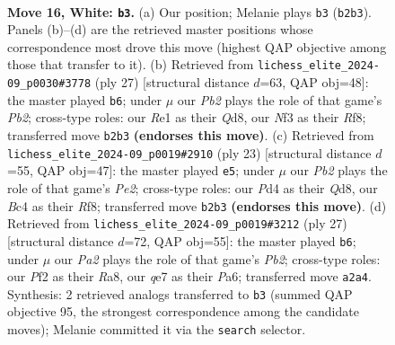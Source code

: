 \documentclass[11pt]{article}
\begin{document}
\clearpage

\begin{figure}[p]\centering
\begin{subfigure}{0.46\textwidth}\centering
\resizebox{\linewidth}{!}{%
\newchessgame
\chessboard[
  setfen={rr4k1/p1pbqppp/4pn2/p7/2BPP2P/5NP1/PP3P2/R2QR1K1 w - - 0 16},
  showmover=false,
  pgfstyle=straightmove, color=movearrow, markmove={b2-b3}
]}
\caption{}
\end{subfigure}\hfill
\begin{subfigure}{0.46\textwidth}\centering
\resizebox{\linewidth}{!}{%
\newchessgame
\chessboard[
  setfen={r2q1rk1/ppp1npp1/6p1/n2p2N1/3P4/P1P4P/2P2PP1/1RBQR1K1 b - - 3 14},
  showmover=false,
  pgfstyle=straightmove, color=movearrow, markmove={b7-b6}
]}
\caption{}
\end{subfigure}
\\[4pt]
\begin{subfigure}{0.46\textwidth}\centering
\resizebox{\linewidth}{!}{%
\newchessgame
\chessboard[
  setfen={r2q1rk1/ppp1p1bp/2np2p1/8/3P4/5N1P/PPP2PP1/R1BQR1K1 b - - 2 12},
  showmover=false,
  pgfstyle=straightmove, color=movearrow, markmove={e7-e5}
]}
\caption{}
\end{subfigure}\hfill
\begin{subfigure}{0.46\textwidth}\centering
\resizebox{\linewidth}{!}{%
\newchessgame
\chessboard[
  setfen={r1bqr1k1/1p3pp1/p2p1n1p/4p3/P3P3/2PP1N1P/3Q1PP1/R1B1R1K1 b - - 0 14},
  showmover=false,
  pgfstyle=straightmove, color=movearrow, markmove={b7-b6}
]}
\caption{}
\end{subfigure}
\caption{\textbf{Move 16, White: \texttt{b3}.} (a) Our position; Melanie plays \texttt{b3} (\texttt{b2b3}). Panels (b)--(d) are the retrieved master positions whose correspondence most drove this move (highest QAP objective among those that transfer to it). (b) Retrieved from \texttt{lichess\_elite\_2024-09\_p0030\#3778} (ply 27) [structural distance $d$=63, QAP obj=48]: the master played \texttt{b6}; under $\mu$ our \emph{Pb2} plays the role of that game's \emph{Pb2}; cross-type roles: our \emph{R}e1 as their \emph{Q}d8, our \emph{N}f3 as their \emph{R}f8; transferred move \texttt{b2b3} \textbf{(endorses this move)}. (c) Retrieved from \texttt{lichess\_elite\_2024-09\_p0019\#2910} (ply 23) [structural distance $d$=55, QAP obj=47]: the master played \texttt{e5}; under $\mu$ our \emph{Pb2} plays the role of that game's \emph{Pe2}; cross-type roles: our \emph{P}d4 as their \emph{Q}d8, our \emph{B}c4 as their \emph{R}f8; transferred move \texttt{b2b3} \textbf{(endorses this move)}. (d) Retrieved from \texttt{lichess\_elite\_2024-09\_p0019\#3212} (ply 27) [structural distance $d$=72, QAP obj=55]: the master played \texttt{b6}; under $\mu$ our \emph{Pa2} plays the role of that game's \emph{Pb2}; cross-type roles: our \emph{P}f2 as their \emph{R}a8, our \emph{q}e7 as their \emph{P}a6; transferred move \texttt{a2a4}. Synthesis: 2 retrieved analogs transferred to \texttt{b3} (summed QAP objective 95, the strongest correspondence among the candidate moves); Melanie committed it via the \texttt{search} selector.}
\label{fig:thought-m30}
\end{figure}
\end{document}
